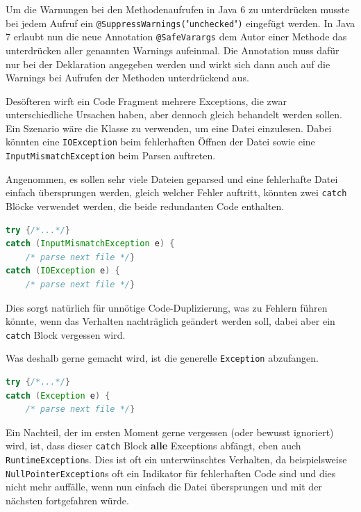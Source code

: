 \documentclass[times, 10pt,twocolumn]{article}
\begin{document}
Um die Warnungen bei den Methodenaufrufen in Java 6 zu unterdrücken musste bei jedem Aufruf ein 
\texttt{@SuppressWarnings(}"\texttt{unchecked}"\texttt{)} eingefügt werden. In Java 7 erlaubt nun die neue Annotation \texttt{@SafeVarargs} dem Autor einer Methode das unterdrücken aller genannten Warnings aufeinmal. Die Annotation muss dafür nur bei der Deklaration angegeben werden und wirkt sich dann auch auf die Warnings bei Aufrufen der Methoden unterdrückend aus.

Desöfteren wirft ein Code Fragment mehrere Exceptions, die zwar unterschiedliche Ursachen haben, aber dennoch gleich behandelt
werden sollen. Ein Szenario wäre die Klasse  zu verwenden, um eine Datei einzulesen. Dabei könnten eine 
\texttt{IOException} beim fehlerhaften Öffnen der Datei sowie eine \texttt{InputMismatchException} beim Parsen auftreten.

Angenommen, es sollen sehr viele Dateien geparsed und eine fehlerhafte Datei einfach übersprungen werden, 
gleich welcher Fehler auftritt, könnten zwei \texttt{catch} Blöcke verwendet werden, die beide redundanten Code enthalten.
\begin{lstlisting}[language=java,breaklines=true]
try {/*...*/} 
catch (InputMismatchException e) {
	/* parse next file */}
catch (IOException e) {
	/* parse next file */}
\end{lstlisting} 
Dies sorgt natürlich für unnötige Code-Duplizierung, was zu Fehlern führen könnte, wenn das Verhalten nachträglich geändert 
werden soll, dabei aber ein \texttt{catch} Block vergessen wird.

Was deshalb gerne gemacht wird, ist die generelle \texttt{Exception} abzufangen.
\begin{lstlisting}[language=java,breaklines=true]
try {/*...*/} 
catch (Exception e) {
	/* parse next file */}
\end{lstlisting}
Ein Nachteil, der im ersten Moment gerne vergessen (oder bewusst ignoriert) wird, ist, dass dieser \texttt{catch} Block 
\textbf{alle} Exceptions abfängt, eben auch \texttt{RuntimeException}s. Dies ist oft ein unterwünschtes Verhalten, da 
beispielsweise \texttt{NullPointerException}s oft ein Indikator für fehlerhaften Code sind und dies nicht mehr auffälle,
wenn nun einfach die Datei übersprungen und mit der nächsten fortgefahren würde.
\end{document}
